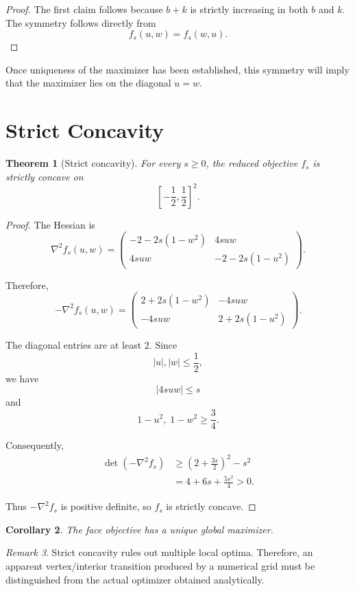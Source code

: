 \documentclass[11pt]{article}
\newtheorem{theorem}{Theorem}[section]
\newtheorem{corollary}[theorem]{Corollary}
\theoremstyle{remark}
\newtheorem{remark}[theorem]{Remark}
\begin{document}
\begin{proof}
The first claim follows because $b+k$ is strictly increasing in both $b$ and $k$. The symmetry follows directly from
\[
f_s(u,w)=f_s(w,u).
\]
\end{proof}

Once uniqueness of the maximizer has been established, this symmetry will imply that the maximizer lies on the diagonal $u=w$.

\section{Strict Concavity}

\begin{theorem}[Strict concavity]
For every $s\geq 0$, the reduced objective $f_s$ is strictly concave on
\[
\left[-\frac12,\frac12\right]^2.
\]
\end{theorem}

\begin{proof}
The Hessian is
\[
\nabla^2 f_s(u,w)
=
\begin{pmatrix}
-2-2s(1-w^2) & 4suw\\
4suw & -2-2s(1-u^2)
\end{pmatrix}.
\]

Therefore,
\[
-\nabla^2 f_s(u,w)
=
\begin{pmatrix}
2+2s(1-w^2) & -4suw\\
-4suw & 2+2s(1-u^2)
\end{pmatrix}.
\]

The diagonal entries are at least $2$. Since
\[
|u|,|w|\leq \frac12,
\]
we have
\[
|4suw|\leq s
\]
and
\[
1-u^2,\;1-w^2\geq \frac34.
\]

Consequently,
\begin{align}
\det(-\nabla^2 f_s)
&\geq
\left(2+\frac{3s}{2}\right)^2-s^2\\
&=
4+6s+\frac{5s^2}{4}>0.
\end{align}

Thus $-\nabla^2 f_s$ is positive definite, so $f_s$ is strictly concave.
\end{proof}

\begin{corollary}
The face objective has a unique global maximizer.
\end{corollary}

\begin{remark}
Strict concavity rules out multiple local optima. Therefore, an apparent
vertex/interior transition produced by a numerical grid must be distinguished
from the actual optimizer obtained analytically.
\end{remark}
\end{document}
